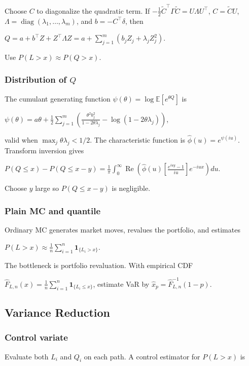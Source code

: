 Choose $C$ to diagonalize the quadratic term. If $-\frac12\tilde C^\top\Gamma\tilde C=U\Lambda U^\top$, $C=\tilde C U$, $\Lambda=\operatorname{diag}(\lambda_1,\ldots,\lambda_m)$, and $b=-C^\top\delta$, then

$Q=a+b^\top Z+Z^\top\Lambda Z=a+\sum_{j=1}^m(b_jZ_j+\lambda_jZ_j^2)$.

Use $P(L>x)\approx P(Q>x)$.

\subsubsection*{Distribution of $Q$}

The cumulant generating function $\psi(\theta)=\log\mathbb{E}[e^{\theta Q}]$ is

$\psi(\theta)=a\theta+\frac12\sum_{j=1}^m\left(\frac{\theta^2b_j^2}{1-2\theta\lambda_j}-\log(1-2\theta\lambda_j)\right)$,

valid when $\max_j\theta\lambda_j<1/2$. The characteristic function is $\hat\phi(u)=e^{\psi(iu)}$. Transform inversion gives

$P(Q\le x)-P(Q\le x-y)=\frac1\pi\int_0^\infty\operatorname{Re}\left(\hat\phi(u)\left[\frac{e^{iuy}-1}{iu}\right]e^{-iux}\right)du$.

Choose $y$ large so $P(Q\le x-y)$ is negligible.

\subsubsection*{Plain MC and quantile}

Ordinary MC generates market moves, revalues the portfolio, and estimates

$P(L>x)\approx\frac1n\sum_{i=1}^n\mathbf{1}_{\{L_i>x\}}$.

The bottleneck is portfolio revaluation. With empirical CDF

$\hat F_{L,n}(x)=\frac1n\sum_{i=1}^n\mathbf{1}_{\{L_i\le x\}}$,
estimate VaR by $\hat x_p=\hat F_{L,n}^{-1}(1-p)$.

\subsection{Variance Reduction}

\subsubsection*{Control variate}

Evaluate both $L_i$ and $Q_i$ on each path. A control estimator for $P(L>x)$ is

